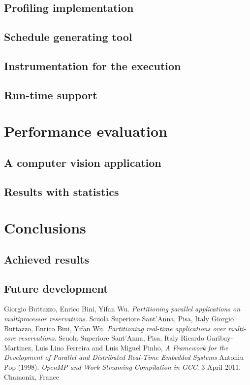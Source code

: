 \documentclass[a4paper,11pt,oneside]{book}
\begin{document}
\section{Profiling implementation}
\section{Schedule generating tool}
\section{Instrumentation for the execution}
\section{Run-time support}

\chapter{Performance evaluation}
\section{A computer vision application}
\section{Results with statistics}

\chapter{Conclusions}
\section{Achieved results}
\section{Future development}

\begin{thebibliography}{9}
 Giorgio Buttazzo, Enrico Bini, Yifan Wu. \emph{Partitioning parallel applications on multiprocessor reservations}. Scuola Superiore Sant’Anna, Pisa, Italy
 Giorgio Buttazzo, Enrico Bini, Yifan Wu. \emph{Partitioning real-time applications over multi-core reservations}. Scuola Superiore Sant’Anna, Pisa, Italy
 Ricardo Garibay-Martinez, Luis Lino Ferreira and Luis Miguel Pinho, \emph{A Framework for the Development of Parallel and Distributed Real-Time Embedded Systems}
Antoniu Pop (1998). \emph{OpenMP and Work-Streaming Compilation in GCC}. 3 April 2011, Chamonix, France

\end{thebibliography}
\end{document}
